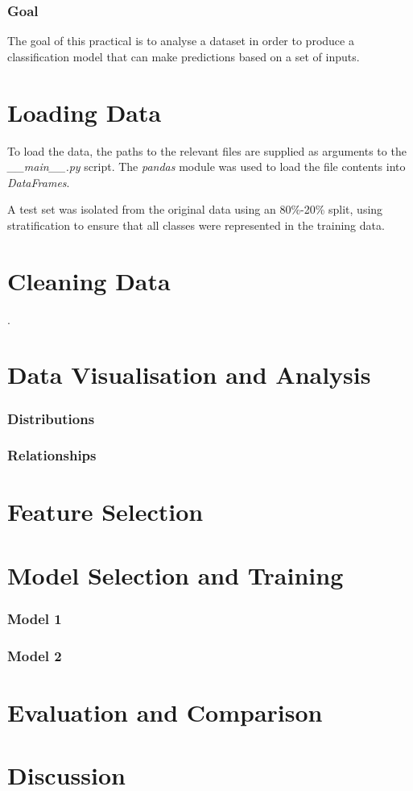 \documentclass[12pt]{article}
\begin{document}
\begin{titlepage}

\vfill %

\end{titlepage}

\section*{Goal}

The goal of this practical is to analyse a dataset in order to produce a classification model that can make predictions based on a set of inputs.

\tableofcontents

\setcounter{page}{1} 

\part{Loading Data}

To load the data, the paths to the relevant files are supplied as arguments to the \emph{\_\_main\_\_.py} script. The \emph{pandas} module was used to load the file contents into \emph{DataFrames}.

A test set was isolated from the original data using an 80\%-20\% split, using stratification to ensure that all classes were represented in the training data.

\part{Cleaning Data}.

\part{Data Visualisation and Analysis}

\section{Distributions}

\section{Relationships}

\part{Feature Selection}
\part{Model Selection and Training}
\section{Model 1}
\section{Model 2}
\part{Evaluation and Comparison}
\part{Discussion}



\end{document}
